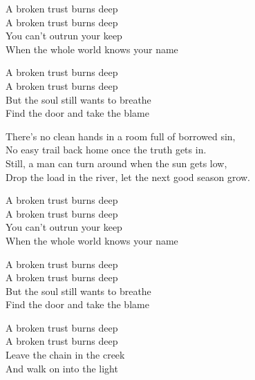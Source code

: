 \begin{lyrics}
A broken trust burns deep\\
A broken trust burns deep\\
You can’t outrun your keep\\
When the whole world knows your name

A broken trust burns deep\\
A broken trust burns deep\\
But the soul still wants to breathe\\
Find the door and take the blame

There’s no clean hands in a room full of borrowed sin,\\
No easy trail back home once the truth gets in.\\
Still, a man can turn around when the sun gets low,\\
Drop the load in the river, let the next good season grow.

A broken trust burns deep\\
A broken trust burns deep\\
You can’t outrun your keep\\
When the whole world knows your name

A broken trust burns deep\\
A broken trust burns deep\\
But the soul still wants to breathe\\
Find the door and take the blame

A broken trust burns deep\\
A broken trust burns deep\\
Leave the chain in the creek\\
And walk on into the light
\end{lyrics}

